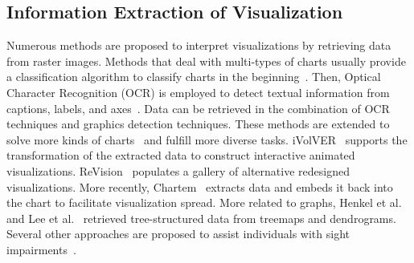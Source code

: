 \subsection{Information Extraction of Visualization}
Numerous methods are proposed to interpret visualizations by retrieving data from raster images.
Methods that deal with multi-types of charts usually provide a classification algorithm to classify charts in the beginning~\cite{DBLP:conf/icip/GaoZB12, DBLP:conf/chi/JungKSHLKS17, DBLP:conf/eccv/SiegelHLDF16, DBLP:journals/vlc/DaiWNZ18}.
Then, Optical Character Recognition (OCR) is employed to detect textual information from captions, labels, and axes~\cite{DBLP:conf/icip/ZhouT00, DBLP:conf/doceng/HuangT07, DBLP:conf/grec/HuangTL03}.
Data can be retrieved in the combination of OCR techniques and graphics detection techniques.
These methods are extended to solve more kinds of charts~\cite{DBLP:conf/pkdd/ClicheRMY17, DBLP:conf/uist/SavvaKCFAH11} and fulfill more diverse tasks.
iVolVER~\cite{DBLP:conf/chi/MendezNV16} supports the transformation of the extracted data to construct interactive animated visualizations.
ReVision~\cite{DBLP:conf/uist/SavvaKCFAH11} populates a gallery of alternative redesigned visualizations.
More recently, Chartem~\cite{DBLP:journals/tvcg/FuZCGWZHTZM21} extracts data and embeds it back into the chart to facilitate visualization spread.
More related to graphs, Henkel et al.~\cite{DBLP:conf/vmv/HenkelKLG20} and Lee et al.~\cite{DBLP:conf/icdar/LeeYWH17} retrieved tree-structured data from treemaps and dendrograms.
Several other approaches are proposed to assist individuals with sight impairments~\cite{DBLP:conf/ismis/ChesterE05, DBLP:journals/tiis/CarberrySMDWGCSOM12, DBLP:journals/cgf/ChoiJPCE19}.

